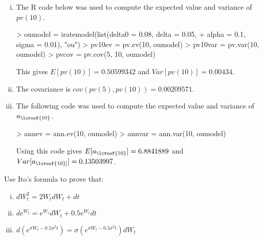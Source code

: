 \documentclass{article}
\numberwithin{questioncounter}{section}
\begin{document}
\begin{solution}
\begin{enumerate}[(i)]
\item The R code below was used to compute the expected value and variance of $pv(10)$.

\begin{Schunk}
\begin{Sinput}
> oumodel = iratemodel(list(delta0 = 0.08, delta = 0.05, 
+                           alpha = 0.1, sigma = 0.01), "ou")
> pv10ev = pv.ev(10, oumodel)
> pv10var = pv.var(10, oumodel)
> pvcov = pv.cov(5, 10, oumodel)
\end{Sinput}
\end{Schunk}

This gives $E[pv(10)] = 0.50599342$ and $Var[pv(10)] = 0.00434$.

\item The covariance is $cov(pv(5), pv(10)) = 0.00209571$.

\item The following code was used to compute the expected value and variance of $a_{\lcroof{10}}$.

\begin{Schunk}
\begin{Sinput}
> annev = ann.ev(10, oumodel)
> annvar = ann.var(10, oumodel)
\end{Sinput}
\end{Schunk}

Using this code gives $E[a_{\lcroof{10}}] = 6.8841889$ and $Var[a_{\lcroof{10}]}] = 0.13503997$.

\end{enumerate}
\end{solution}

\begin{question}
Use Ito's formula to prove that:

\begin{enumerate}[(i)]
\item $dW_{t}^{2} = 2W_{t} dW_{t} + dt$
\item $de^{W_{t}} = e^{W_{t}} dW_{t} + 0.5 e^{W_{t}} dt$
\item $d(e^{\sigma W_{t} - 0.5\sigma^{2} t}) = \sigma (e^{\sigma W_{t} - 0.5 \sigma^{2} t}) dW_{t}$
\end{enumerate}

\end{question}
\end{document}
